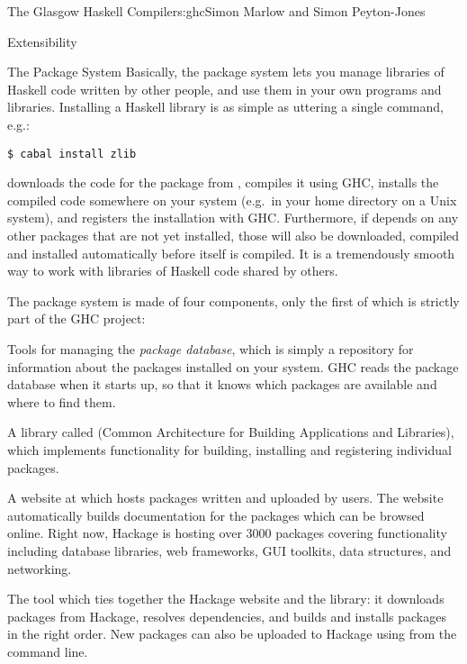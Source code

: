 \begin{aosachapter}{The Glasgow Haskell Compiler}{s:ghc}{Simon Marlow and Simon Peyton-Jones}
\begin{aosasect1}{Extensibility}
\begin{aosasect2}{The Package System}
Basically, the package system lets you manage libraries of Haskell
code written by other people, and use them in your own programs and
libraries.  Installing a Haskell library is as simple as uttering a
single command, e.g.:

\begin{verbatim}
$ cabal install zlib
\end{verbatim}

\noindent downloads the code for the  package from
, compiles it using GHC, installs the
compiled code somewhere on your system (e.g.\ in your home directory
on a Unix system), and registers the installation with GHC.
Furthermore, if  depends on any other packages that are not
yet installed, those will also be downloaded, compiled and installed
automatically before  itself is compiled.  It is a
tremendously smooth way to work with libraries of Haskell code shared
by others.

The package system is made of four components, only the first of which
is strictly part of the GHC project:

\begin{aosaitemize}

\item Tools for managing the \emph{package database}, which is simply
  a repository for information about the packages installed on your
  system.  GHC reads the package database when it starts up, so that
  it knows which packages are available and where to find them.

\item A library called  (Common Architecture for Building
  Applications and Libraries), which implements functionality for
  building, installing and registering individual packages.

\item A website at  which hosts
  packages written and uploaded by users.  The website automatically
  builds documentation for the packages which can be browsed online.
  Right now, Hackage is hosting over 3000 packages covering
  functionality including database libraries, web frameworks, GUI
  toolkits, data structures, and networking.

\item The  tool which ties together the Hackage website
  and the  library: it downloads packages from Hackage,
  resolves dependencies, and builds and installs packages in the right
  order.  New packages can also be uploaded to Hackage using
   from the command line.


\end{aosaitemize}
\end{aosasect2}
\end{aosasect1}
\end{aosachapter}
